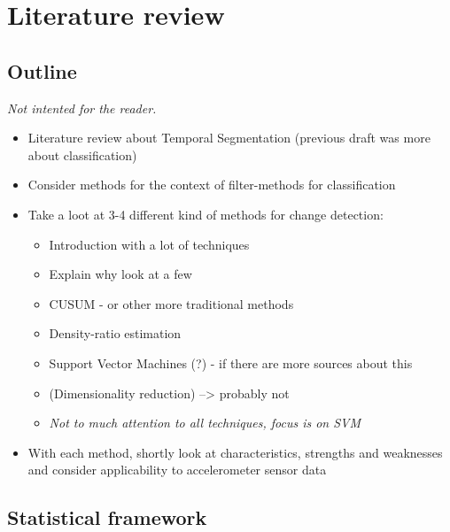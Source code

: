 
\chapter{Literature review}

\label{Chapter2} %


\section{Outline}
\emph{Not intented for the reader.}
\begin{itemize}
  \item Literature review about Temporal Segmentation (previous draft was more about classification)
  \item Consider methods for the context of filter-methods for classification
  \item Take a loot at 3-4 different kind of methods for change detection:
    \begin{itemize}
      \item Introduction with a lot of techniques
      \item Explain why look at a few
      \item CUSUM - or other more traditional methods
      \item Density-ratio estimation
      \item Support Vector Machines (?) - if there are more sources about this
      \item (Dimensionality reduction) --> probably not
      \item \emph{Not to much attention to all techniques, focus is on SVM}
    \end{itemize}
  \item With each method, shortly look at characteristics, strengths and weaknesses and consider applicability to accelerometer sensor data
\end{itemize}


\section{Statistical framework}\label{statistical-framework}


